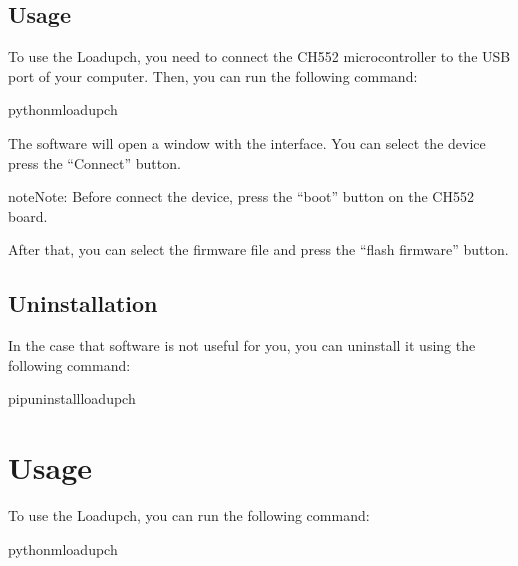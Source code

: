 \documentclass[letterpaper,10pt,english]{sphinxmanual}
\begin{document}
\section{Usage}
\label{\detokenize{installation:usage}}
\sphinxAtStartPar
To use the Loadupch, you need to connect the CH552 microcontroller to the USB port of your computer.
Then, you can run the following command:

\begin{sphinxVerbatim}[commandchars=\\\{\}]
python\PYGZhy{}mloadupch
\end{sphinxVerbatim}

\sphinxAtStartPar
The software will open a window with the interface. You can select the device press the “Connect” button.

\begin{sphinxadmonition}{note}{Note:}
\sphinxAtStartPar
Before connect the device, press the “boot” button on the CH552 board.
\end{sphinxadmonition}

\sphinxAtStartPar
After that, you can select the firmware file and press the “flash firmware” button.


\section{Uninstallation}
\label{\detokenize{installation:uninstallation}}
\sphinxAtStartPar
In the case that software is not useful for you, you can uninstall it using the following command:

\begin{sphinxVerbatim}[commandchars=\\\{\}]
pipuninstallloadupch
\end{sphinxVerbatim}

\sphinxstepscope


\chapter{Usage}
\label{\detokenize{usage:usage}}\label{\detokenize{usage::doc}}
\sphinxAtStartPar
To use the Loadupch, you can run the following command:

\begin{sphinxVerbatim}[commandchars=\\\{\}]
python\PYGZhy{}mloadupch
\end{sphinxVerbatim}
\end{document}

